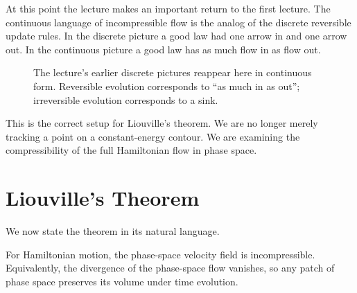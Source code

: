 At this point the lecture makes an important return to the first lecture. The continuous language of incompressible flow is the analog of the discrete reversible update rules. In the discrete picture a good law had one arrow in and one arrow out. In the continuous picture a good law has as much flow in as flow out.

\begin{figure}[h]
\centering
{}
\hspace{1.2cm}
\caption{The lecture's earlier discrete pictures reappear here in continuous form. Reversible evolution corresponds to ``as much in as out''; irreversible evolution corresponds to a sink.}
\end{figure}

This is the correct setup for Liouville's theorem. We are no longer merely tracking a point on a constant-energy contour. We are examining the compressibility of the full Hamiltonian flow in phase space.

\section{Liouville's Theorem}

We now state the theorem in its natural language.

\begin{theorem}
For Hamiltonian motion, the phase-space velocity field is incompressible. Equivalently, the divergence of the phase-space flow vanishes, so any patch of phase space preserves its volume under time evolution.
\end{theorem}

